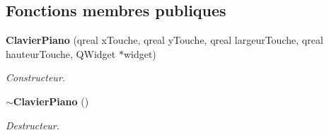\subsection*{Fonctions membres publiques}
\begin{DoxyCompactItemize}
\item 
{\bf Clavier\-Piano} (qreal x\-Touche, qreal y\-Touche, qreal largeur\-Touche, qreal hauteur\-Touche, Q\-Widget $\ast$widget)
\begin{DoxyCompactList}\small\item\em Constructeur. \end{DoxyCompactList}\item 
{\bf $\sim$\-Clavier\-Piano} ()\label{class_clavier_piano_a33d1d8bec0d7d48f009440d40b4302c0}

\begin{DoxyCompactList}\small\item\em Destructeur. \end{DoxyCompactList}\end{DoxyCompactItemize}

